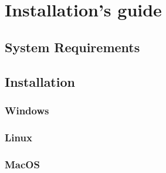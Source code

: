 \section{Installation's guide}

\subsection{System Requirements}

\subsection{Installation}

\subsubsection{Windows}

\subsubsection{Linux}

\subsubsection{MacOS}
